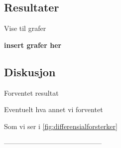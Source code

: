 \subsection{Resultater}
Vise til grafer

\textbf{insert grafer her}



\subsection{Diskusjon}

Forventet resultat

Eventuelt hva annet vi forventet

Som vi ser i  \autoref{fig:differensialforsterker}


------------------------------------------









